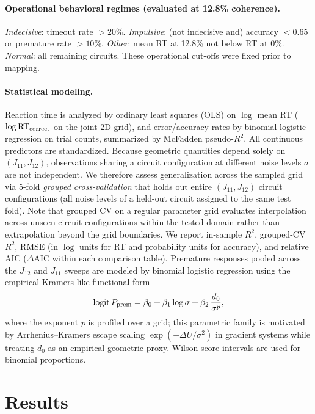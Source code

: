 \documentclass[11pt]{article}
\begin{document}
	\paragraph{Operational behavioral regimes (evaluated at 12.8\% coherence).} \emph{Indecisive}: timeout rate $>20\%$. \emph{Impulsive}: (not indecisive and) accuracy $<0.65$ or premature rate $>10\%$. \emph{Other}: mean RT at 12.8\% not below RT at 0\%. \emph{Normal}: all remaining circuits. These operational cut-offs were fixed prior to mapping.
	
	\paragraph{Statistical modeling.} Reaction time is analyzed by ordinary least squares (OLS) on $\log$ mean RT ($\log\text{RT}_{\rm correct}$ on the joint 2D grid), and error/accuracy rates by binomial logistic regression on trial counts, summarized by McFadden pseudo-$R^2$. All continuous predictors are standardized. Because geometric quantities depend solely on $(J_{11},J_{12})$, observations sharing a circuit configuration at different noise levels $\sigma$ are not independent. We therefore assess generalization across the sampled grid via 5-fold \emph{grouped cross-validation} that holds out entire $(J_{11},J_{12})$ circuit configurations (all noise levels of a held-out circuit assigned to the same test fold). Note that grouped CV on a regular parameter grid evaluates interpolation across unseen circuit configurations within the tested domain rather than extrapolation beyond the grid boundaries. We report in-sample $R^2$, grouped-CV $R^2$, RMSE (in $\log$ units for RT and probability units for accuracy), and relative AIC ($\Delta$AIC within each comparison table). Premature responses pooled across the $J_{12}$ and $J_{11}$ sweeps are modeled by binomial logistic regression using the empirical Kramers-like functional form
	\begin{equation}
		\mathrm{logit}\,P_{\rm prem}=\beta_0+\beta_1\log\sigma+\beta_2\,\frac{d_0}{\sigma^{p}},
	\end{equation}
	where the exponent $p$ is profiled over a grid; this parametric family is motivated by Arrhenius--Kramers escape scaling $\exp(-\Delta U/\sigma^2)$ in gradient systems \citep{Kramers1940, Hanggi1990} while treating $d_0$ as an empirical geometric proxy. Wilson score intervals are used for binomial proportions.
	
	\section{Results}
\end{document}
